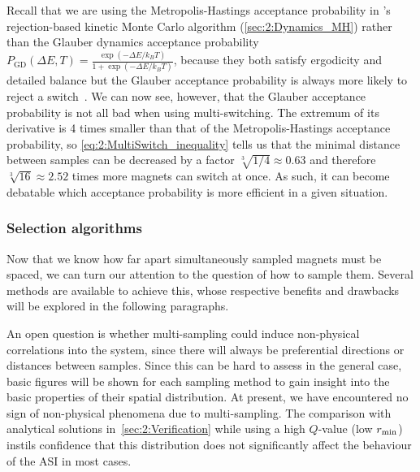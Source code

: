 Recall that we are using the Metropolis-Hastings acceptance probability in \hotspice's rejection-based kinetic Monte Carlo algorithm (\cref{sec:2:Dynamics_MH}) rather than the Glauber dynamics acceptance probability $P_\mathrm{GD}(\Delta E, T) = \frac{\exp(-\Delta E/k_B T)}{1+\exp(-\Delta E/k_B T)}$, because they both satisfy ergodicity and detailed balance but the Glauber acceptance probability is always more likely to reject a switch~\cite{bit-player_MCvsGlauber}.
We can now see, however, that the Glauber acceptance probability is not all bad when using multi-switching.
The extremum of its derivative is 4 times smaller than that of the Metropolis-Hastings acceptance probability, so \cref{eq:2:MultiSwitch_inequality} tells us that the minimal distance between samples can be decreased by a factor $\sqrt[3]{1/4} \approx 0.63$ and therefore $\sqrt[3]{16} \approx 2.52$ times more magnets can switch at once.
As such, it can become debatable which acceptance probability is more efficient in a given situation.

\subsubsection{Selection algorithms}
Now that we know how far apart simultaneously sampled magnets must be spaced, we can turn our attention to the question of how to sample them.
Several methods are available to achieve this, whose respective benefits and drawbacks will be explored in the following paragraphs. \par
An open question is whether multi-sampling could induce non-physical correlations into the system, since there will always be preferential directions or distances between samples.
Since this can be hard to assess in the general case, basic figures will be shown for each sampling method to gain insight into the basic properties of their spatial distribution.
At present, we have encountered no sign of non-physical phenomena due to multi-sampling.
The comparison with analytical solutions in~\cref{sec:2:Verification} while using a high $Q$-value (low $r_\mathrm{min}$) instils confidence that this distribution does not significantly affect the behaviour of the ASI in most cases.

